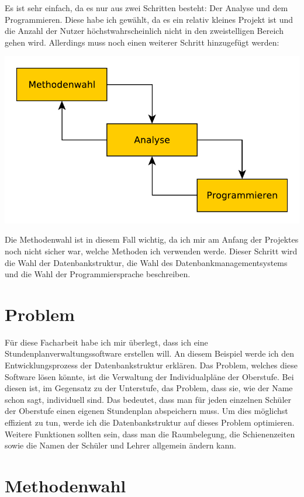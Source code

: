 \documentclass[a4paper, 12pt]{article}
\theoremstyle{plain}
\theoremstyle{definition}
\begin{document}
	Es ist sehr einfach, da es nur aus zwei Schritten besteht: Der Analyse und dem Programmieren. Diese habe ich gewählt, da es ein relativ kleines Projekt ist und die Anzahl der Nutzer höchstwahrscheinlich nicht in den zweistelligen Bereich gehen wird. Allerdings muss noch einen weiterer Schritt hinzugefügt werden:
	\begin{center}
	\includegraphics[scale=0.7]{newprojModell.pdf}
	\end{center}
	
	Die Methodenwahl ist in diesem Fall wichtig, da ich mir am Anfang der Projektes noch nicht sicher war, welche Methoden ich verwenden werde. Dieser Schritt wird die Wahl der Datenbankstruktur, die Wahl des Datenbankmanagementsystems und die Wahl der Programmiersprache beschreiben.
	\section{Problem}
	\label{sec:prob}
	Für diese Facharbeit habe ich mir überlegt, dass ich eine Stundenplanverwaltungssoftware erstellen will. An diesem Beispiel werde ich den Entwicklungsprozess der Datenbankstruktur erklären. Das Problem, welches diese Software lösen könnte, ist die Verwaltung der Individualpläne der Oberstufe. Bei diesen ist, im Gegensatz zu der Unterstufe, das Problem, dass sie, wie der Name schon sagt, individuell sind. Das bedeutet, dass man für jeden einzelnen Schüler der Oberstufe einen eigenen Stundenplan abspeichern muss. Um dies möglichst effizient zu tun, werde ich die Datenbankstruktur auf dieses Problem optimieren. Weitere Funktionen sollten sein, dass man die Raumbelegung, die Schienenzeiten sowie die Namen der Schüler und Lehrer allgemein ändern kann.	
	
	\section{Methodenwahl}
	\label{sec:allgInfo}
		
\end{document}
